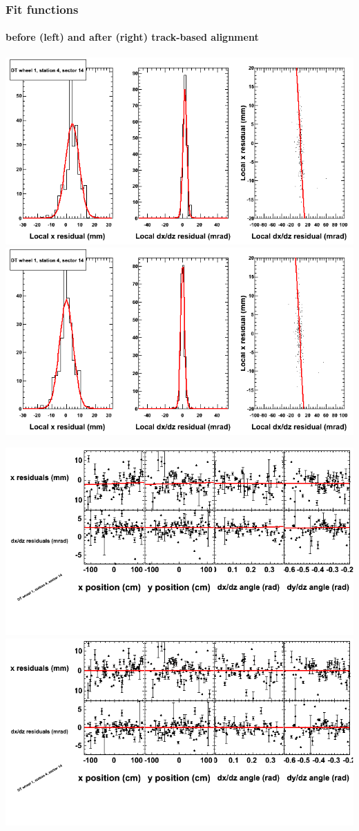 \documentclass[compress]{beamer}
\begin{document}
\begin{frame}
\frametitle{Fit functions}
\framesubtitle{before (left) and after (right) track-based alignment}
\includegraphics[width=0.5\linewidth]{fitfunctions_re01/MBwhDst4sec14_bellcurves.png} \includegraphics[width=0.5\linewidth]{fitfunctions_re05/MBwhDst4sec14_bellcurves.png}

\includegraphics[width=0.5\linewidth]{fitfunctions_re01/MBwhDst4sec14_polynomials.png} \includegraphics[width=0.5\linewidth]{fitfunctions_re05/MBwhDst4sec14_polynomials.png}
\end{frame}
\end{document}
